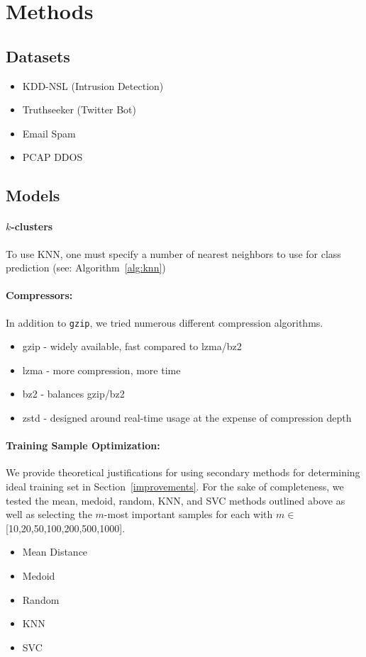 \documentclass[sigconf]{acmart}
\begin{document}
\section{Methods}

\subsection{Datasets}
\begin{itemize}
    \item KDD-NSL (Intrusion Detection)
    \item Truthseeker (Twitter Bot)
    \item Email Spam
    \item PCAP DDOS
\end{itemize}
\subsection{Models}

\paragraph{$k$-clusters}
To use KNN, one must specify a number of nearest neighbors to use for class prediction (see: Algorithm~\ref{alg:knn})
\paragraph{Compressors:} In addition to \texttt{gzip}, we tried numerous different compression algorithms. 
\begin{itemize}
    \item gzip - widely available, fast compared to lzma/bz2
    \item lzma - more compression, more time
    \item bz2 - balances gzip/bz2
    \item zstd - designed around real-time usage at the expense of compression depth
\end{itemize}

\paragraph{Training Sample Optimization:}
We provide theoretical justifications for using secondary methods for determining ideal training set in Section~\ref{improvements}. For the sake of completeness, we tested the mean, medoid, random, KNN, and SVC methods outlined above as well as selecting the $m$-most important samples for each with $m \in$ [10,20,50,100,200,500,1000]. 
\begin{itemize}
    \item Mean Distance
    \item Medoid
    \item Random
    \item KNN
    \item SVC
\end{itemize}
\end{document}

